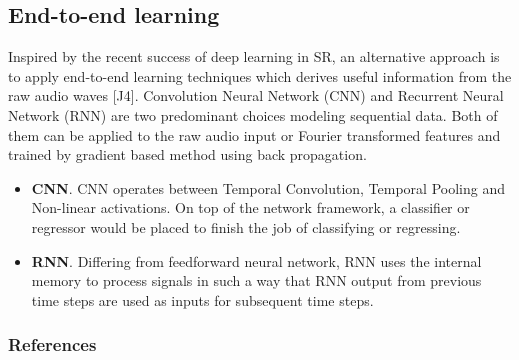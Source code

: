 \documentclass{article} %
\begin{document}
\subsection{End-to-end learning}
Inspired by the recent success of deep learning in SR, an alternative approach is to apply end-to-end learning techniques which derives useful information from the raw audio waves [J4]. 
Convolution Neural Network (CNN) and Recurrent Neural Network (RNN) are two predominant choices modeling sequential data. Both of them can be applied to the raw audio input or Fourier transformed features and trained by gradient based method using back propagation.
\begin{itemize}
\item \textbf{CNN}. CNN operates between Temporal Convolution, Temporal Pooling and Non-linear activations. On top of the network framework, a classifier or regressor would be placed to finish the job of classifying or regressing.
\item \textbf{RNN}. Differing from feedforward neural network, RNN uses the internal memory to process signals in such a way that RNN output from previous time steps are used as inputs for subsequent time steps.
\end{itemize}



 




\subsubsection*{References}
\end{document}
